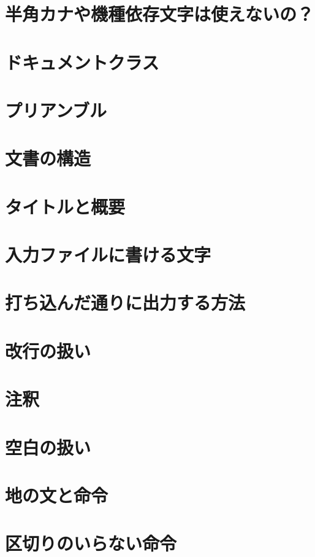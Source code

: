 \documentclass{jsbook}
\begin{document}
\section{半角カナや機種依存文字は使えないの？}

\section{ドキュメントクラス}

\section{プリアンブル}

\section{文書の構造}

\section{タイトルと概要}

\section{入力ファイルに書ける文字}

\section{打ち込んだ通りに出力する方法}

\section{改行の扱い}

\section{注釈}

\section{空白の扱い}

\section{地の文と命令}

\section{区切りのいらない命令}
\end{document}
